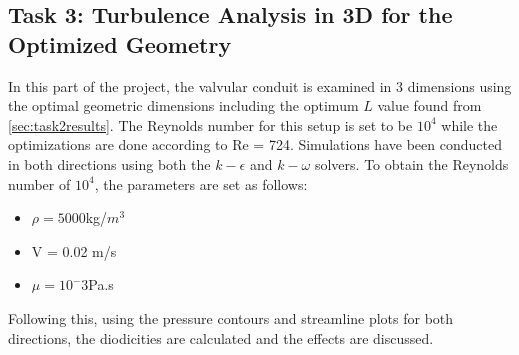 \subsection{Task 3: Turbulence Analysis in 3D for the Optimized Geometry}
\label{sec:task3}

In this part of the project, the valvular conduit is examined in 3 dimensions using the optimal geometric dimensions including the optimum $L$ value found from \ref{sec:task2results}. The Reynolds number for this setup is set to be $10^4$ while the optimizations are done according to Re = 724. Simulations have been conducted in both directions using both the $k - \epsilon$ and $k - \omega$ solvers. To obtain the Reynolds number of $10^4$, the parameters are set as follows:
\begin{itemize}
    \item $\rho = 5000$kg/$m^3$
    \item V = 0.02 m/s
    \item $\mu = 10^-3$Pa.s
\end{itemize}

Following this, using the pressure contours and streamline plots for both directions, the diodicities are calculated and the effects are discussed. 